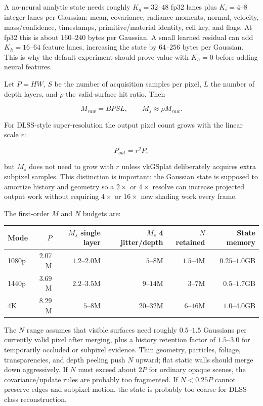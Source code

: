 \documentclass[11pt]{article}
\begin{document}
A no-neural analytic state needs roughly $K_g=32$--$48$ fp32 lanes plus
$K_i=4$--$8$ integer lanes per Gaussian: mean, covariance, radiance moments,
normal, velocity, mass/confidence, timestamps, primitive/material identity,
cell key, and flags. At fp32 this is about $160$--$240$ bytes per Gaussian. A
small learned residual can add $K_h=16$--$64$ feature lanes, increasing the
state by $64$--$256$ bytes per Gaussian. This is why the default experiment
should prove value with $K_h=0$ before adding neural features.

Let $P=H W$, $S$ be the number of acquisition samples per pixel, $L$ the number
of depth layers, and $\rho$ the valid-surface hit ratio. Then

\[
  M_{raw}=B P S L,
  \qquad
  M_s\approx \rho M_{raw}.
\]

For DLSS-style super-resolution the output pixel count grows with the linear
scale $r$:

\[
  P_{out}=r^2P,
\]

but $M_s$ does not need to grow with $r$ unless vkGSplat deliberately acquires
extra subpixel samples. This distinction is important: the Gaussian state is
supposed to amortize history and geometry so a $2\times$ or $4\times$ resolve
can increase projected output work without requiring $4\times$ or $16\times$
new shading work every frame.

The first-order $M$ and $N$ budgets are:

\begin{center}
\begin{tabular}{lrrrrr}
\toprule
Mode & $P$ & $M_s$ single layer & $M_s$ 4 jitter/depth & $N$ retained & State memory \\
\midrule
1080p & $2.07$M & $1.2$--$2.0$M & $5$--$8$M & $1.5$--$4$M & $0.25$--$1.0$GB \\
1440p & $3.69$M & $2.2$--$3.5$M & $9$--$14$M & $3$--$7$M & $0.5$--$1.7$GB \\
4K    & $8.29$M & $5$--$8$M   & $20$--$32$M & $6$--$16$M & $1.0$--$4.0$GB \\
\bottomrule
\end{tabular}
\end{center}

The $N$ range assumes that visible surfaces need roughly $0.5$--$1.5$
Gaussians per currently valid pixel after merging, plus a history retention
factor of $1.5$--$3.0$ for temporarily occluded or subpixel evidence. Thin
geometry, particles, foliage, transparencies, and depth peeling push $N$ upward;
flat static walls should merge down aggressively. If $N$ must exceed about
$2P$ for ordinary opaque scenes, the covariance/update rules are probably too
fragmented. If $N<0.25P$ cannot preserve edges and subpixel motion, the state
is probably too coarse for DLSS-class reconstruction.
\end{document}
